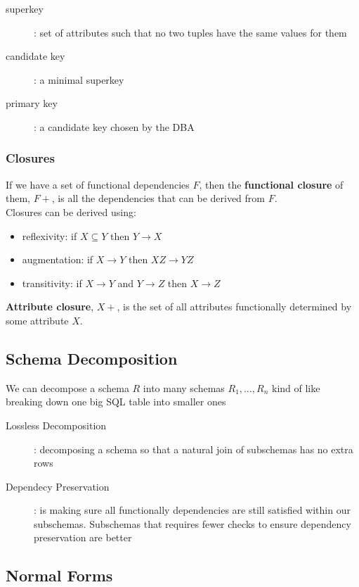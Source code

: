 \documentclass[]{article}
\theoremstyle{definition}
\begin{document}
	\begin{description}
		\item[superkey]: set of attributes such that no two tuples have the same values for them
		\item[candidate key]: a minimal superkey
		\item[primary key]: a candidate key chosen by the DBA
	\end{description}

	\subsubsection{Closures}
	If we have a set of functional dependencies $F$, then the \textbf{functional closure} of them, $F+$, is 
	all the dependencies that can be derived from $F$. \\

	Closures can be derived using:
	\begin{itemize}
		\item reflexivity: if $X \subseteq Y$ then $Y \rightarrow X$
		\item augmentation: if $X \rightarrow Y$ then $XZ \rightarrow YZ$
		\item transitivity: if $X \rightarrow Y$ and $Y \rightarrow Z$ then $X \rightarrow Z$
	\end{itemize}

	\textbf{Attribute closure}, $X+$, is the set of all attributes functionally determined by some attribute $X$.

	\subsection{Schema Decomposition}
	We can decompose a schema $R$ into many schemas $R_1,\dots,R_n$ kind of like breaking down one big SQL table into smaller ones \\

	\begin{description}
		\item[Lossless Decomposition]: decomposing a schema so that a natural join of subschemas has no extra rows
		\item[Dependecy Preservation]: is making sure all functionally dependencies are still satisfied within our subschemas.
			Subschemas that requires fewer checks to ensure dependency preservation are better
	\end{description}

	\subsection{Normal Forms}
\end{document}
